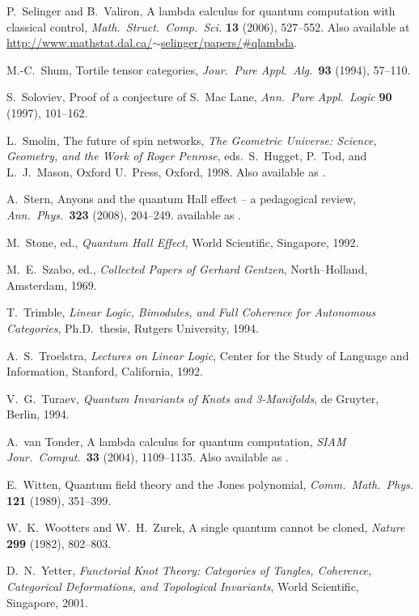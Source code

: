 \documentclass[12pt]{article}
\begin{document}
\begin{thebibliography}{99}
 P.\ Selinger and B.\ Valiron,
A lambda calculus for quantum computation with classical control,
{\sl Math.\ Struct.\ Comp.\ Sci.} {\bf 13} (2006), 527--552.
Also available at \hfill \break 
\href{http://www.mathstat.dal.ca/~selinger/papers/#qlambda}{ http://www.mathstat.dal.ca/$\sim$selinger/papers/\#qlambda}.

M.-C.\ Shum, Tortile tensor categories,
\textsl{Jour.\ Pure Appl.\ Alg.\ }\textbf{93} (1994), 57--110.

 S.\ Soloviev, Proof of a conjecture of S.\ Mac 
Lane, {\sl Ann.\ Pure Appl.\ Logic} {\bf 90} (1997), 101--162.

 L.\ Smolin, The future of spin networks, 
{\sl The Geometric Universe: Science, Geometry, and the Work of 
Roger Penrose}, eds.\ S.\ Hugget, P.\ Tod, and L.\ J.\ Mason, 
Oxford U.\ Press, Oxford, 1998.  Also available as .

 A.\ Stern, Anyons and the quantum Hall effect --
a pedagogical review, {\sl Ann.\ Phys.\ }{\bf 323} (2008), 204--249.
available as .

 M.\ Stone, ed., {\sl Quantum Hall Effect}, 
World Scientific, Singapore, 1992.

 M.\ E.\ Szabo, ed., {\sl Collected Papers of Gerhard 
Gentzen}, North--Holland, Amsterdam, 1969.


 T.\ Trimble, {\sl Linear Logic, Bimodules, and Full 
Coherence for Autonomous Categories}, Ph.D.\ thesis, Rutgers University, 
1994. 

 A.\ S.\ Troelstra, {\sl Lectures on Linear Logic},
Center for the Study of Language and Information, Stanford, California,
1992.

 V.\ G.\ Turaev, {\sl Quantum Invariants of Knots
and 3-Manifolds}, de Gruyter, Berlin, 1994.

 A.\ van Tonder, A lambda calculus for quantum computation,
{\sl SIAM Jour.\ Comput.\ }{\bf 33} (2004), 1109--1135. 
Also available as .

 E.\ Witten, Quantum field theory and the Jones polynomial,
\textsl{Comm.\ Math.\ Phys.} \textbf{121} (1989), 351--399.

 W.\ K.\ Wootters and W.\ H.\ Zurek,
A single quantum cannot be cloned, {\sl Nature} {\bf 299} 
(1982), 802--803. 

 D.\ N.\ Yetter, {\sl Functorial Knot Theory: Categories of 
Tangles, Coherence, Categorical Deformations, and Topological 
Invariants}, World Scientific, Singapore, 2001.

\end{thebibliography}
\end{document}
